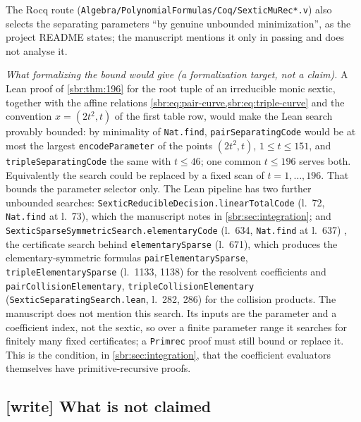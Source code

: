 \documentclass[11pt,letterpaper]{article}
\numberwithin{equation}{section}
\theoremstyle{definition}
\theoremstyle{remark}
\newcommand{\src}[1]{\texttt{\nolinkurl{#1}}}
\begin{document}
The Rocq route (\src{Algebra/PolynomialFormulas/Coq/SexticMuRec*.v}) also
selects the separating parameters ``by genuine unbounded minimization'', as
the project README states; the manuscript mentions it only in passing and
does not analyse it.

\emph{What formalizing the bound would give (a formalization target, not a
claim).} A Lean proof of \cref{sbr:thm:196} for the root tuple of an
irreducible monic sextic, together with the affine relations
\cref{sbr:eq:pair-curve,sbr:eq:triple-curve} and the convention
$x=(2t^2,t)$ of the first table row, would make the Lean search
provably bounded: by minimality of \src{Nat.find}, \src{pairSeparatingCode}
would be at most the largest \src{encodeParameter} of the points
$(2t^2,t)$, $1\le t\le151$, and \src{tripleSeparatingCode} the same with
$t\le46$; one common $t\le196$ serves both. Equivalently the search could be
replaced by a fixed scan of $t=1,\ldots,196$. That bounds the
parameter selector only. The Lean pipeline has two further unbounded
searches: \src{SexticReducibleDecision.linearTotalCode} (l.~72,
\src{Nat.find} at l.~73), which the manuscript notes in
\cref{sbr:sec:integration}; and \src{SexticSparseSymmetricSearch.elementaryCode}
(l.~634, \src{Nat.find} at l.~637) \cite{repo-sparse-search}, the
certificate search behind \src{elementarySparse} (l.~671), which produces
the elementary-symmetric formulas \src{pairElementarySparse},
\src{tripleElementarySparse} (l.~1133, 1138) for the resolvent
coefficients and \src{pairCollisionElementary},
\src{tripleCollisionElementary} (\src{SexticSeparatingSearch.lean}, l.~282,
286) for the collision products. The manuscript does not mention this
search. Its inputs are the parameter and a coefficient index, not the
sextic, so over a finite parameter range it searches for finitely many
fixed certificates; a \src{Primrec} proof must still bound or replace it.
This is the condition, in \cref{sbr:sec:integration}, that the coefficient
evaluators themselves have primitive-recursive proofs.

\subsection{[write] What is not claimed}
\label{sbr:sec:nonclaims}
\end{document}
